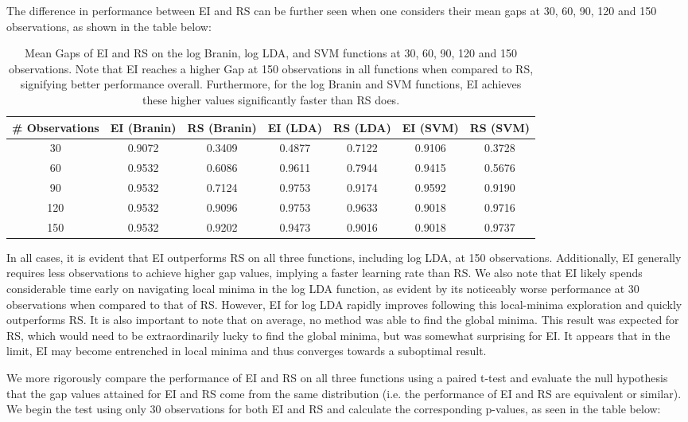 \documentclass[11pt]{article}
\numberwithin{equation}{section}
\begin{document}
The difference in performance between EI and RS can be further seen when one considers their mean gaps at 30, 60, 90, 120 and 150 observations, as shown in the table below:
\begin{table}[H]
  \centering
  \begin{tabular}{| c | c | c | c | c | c | c |}
    \hline
    \# Observations & EI (Branin) & RS (Branin) & EI (LDA)& RS (LDA) & EI (SVM)& RS (SVM)\\ 
    \hline
    30 & 0.9072 & 0.3409 & 0.4877 & 0.7122 & 0.9106 & 0.3728 \\ 
    \hline
    60 & 0.9532 & 0.6086 & 0.9611 & 0.7944 & 0.9415 & 0.5676 \\ 
    \hline
    90 & 0.9532 & 0.7124 & 0.9753 & 0.9174 & 0.9592 & 0.9190 \\ 
    \hline
    120 & 0.9532 & 0.9096 & 0.9753 & 0.9633 & 0.9018 & 0.9716 \\ 
    \hline
    150 & 0.9532 & 0.9202 & 0.9473 & 0.9016 & 0.9018 & 0.9737 \\ 
    \hline
   \end{tabular}
   \caption{Mean Gaps of EI and RS on the log Branin, log LDA, and SVM functions at 30, 60, 90, 120 and 150 observations. Note that EI reaches a higher Gap at 150 observations in all functions when compared to RS, signifying better performance overall. Furthermore, for the log Branin and SVM functions, EI achieves these higher values significantly faster than RS does.}
   \label{tab:ei-rs-observations}
\end{table}

In all cases, it is evident that EI outperforms RS on all three functions, including log LDA, at 150 observations. 
Additionally, EI generally requires less observations to achieve higher gap values, implying a faster learning rate than RS. We also note that EI likely spends considerable time early on navigating local minima in the log LDA function, 
as evident by its noticeably worse performance at 30 observations when compared to that of RS. However, EI for log LDA rapidly improves following this local-minima exploration and quickly outperforms RS. It is also important to note that on average, no method was able to find the global minima. This result was expected for RS, which would need to be extraordinarily lucky to find the global minima, but was somewhat surprising for EI. It appears that in the limit, EI may become entrenched in local minima and thus converges towards a suboptimal result. 

We more rigorously compare the performance of EI and RS on all three functions using a paired t-test and evaluate the null hypothesis that the gap values attained for EI and RS come from the same distribution (i.e. the performance of EI and RS are equivalent or similar). We begin the test using only 30 observations for both EI and RS and calculate the corresponding p-values, as seen in the table below:
\end{document}
